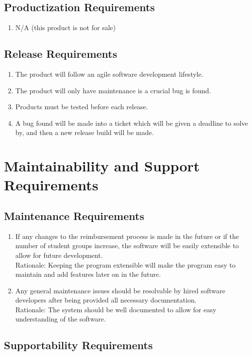 \documentclass[12pt]{article}
\begin{document}
\subsection{Productization Requirements}
\begin{enumerate}
  \item N/A (this product is not for sale) 
\end{enumerate}
\subsection{Release Requirements}
\begin{enumerate}
  \item The product will follow an agile software development lifestyle.
  \item The product will only have maintenance is a crucial bug is found. 
  \item Products must be tested before each release. 
  \item A bug found will be made into a ticket which will be given a deadline to solve by, and then a new release build will be made.  
\end{enumerate}

\section{Maintainability and Support Requirements}
\subsection{Maintenance Requirements}

\begin{enumerate}
  
  \item If any changes to the reimbursement process is made in the future or if the number of student groups increase, the software will be easily extensible to allow for future development. \\
  Rationale: Keeping the program extensible will make the program easy to maintain and add features later on in the future.
  \item Any general maintenance issues should be resolvable by hired software developers after being provided all necessary documentation. \\
  Rationale: The system should be well documented to allow for easy understanding of the software.
\end{enumerate}
\subsection{Supportability Requirements}
\end{document}
